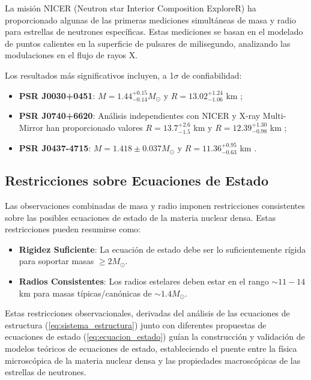 La misión NICER (Neutron star Interior Composition ExploreR) ha proporcionado algunas de las primeras mediciones simultáneas de masa y radio para estrellas de neutrones específicas. Estas mediciones se basan en el modelado de puntos calientes en la superficie de pulsares de milisegundo, analizando las modulaciones en el flujo de rayos X.

Los resultados más significativos incluyen, a 1$\sigma$ de confiabilidad:

\begin{itemize}
	\item \textbf{PSR J0030+0451}: $M = 1.44^{+0.15}_{-0.14} M_\odot$ y $R = 13.02^{+1.24}_{-1.06}$ km \cite{millerPSRJ0030+0451Mass2019};
	
	\item \textbf{PSR J0740+6620}: Análisis independientes con NICER y X-ray Multi-Mirror han proporcionado valores $R = 13.7^{+2.6}_{-1.5}$ km \cite{millerRadiusPSRJ0740+66202021} y $R = 12.39^{+1.30}_{-0.98}$ km \cite{rileyNICERViewMassive2021};
	
	\item \textbf{PSR J0437-4715}: $M = 1.418 \pm 0.037 M_\odot$ y $R = 11.36^{+0.95}_{-0.63}$ km \cite{choudhuryNICERViewNearest2024}.
\end{itemize}


\subsection{Restricciones sobre Ecuaciones de Estado}

Las observaciones combinadas de masa y radio imponen restricciones consistentes sobre las posibles ecuaciones de estado de la materia nuclear densa. Estas restricciones pueden resumirse como:

\begin{itemize}
	\item \textbf{Rigidez Suficiente}: La ecuación de estado debe ser lo suficientemente rígida para soportar masas $\geq 2 M_\odot$.
	
	\item \textbf{Radios Consistentes}: Los radios estelares deben estar en el rango $\sim 11-14$ km para masas típicas/canónicas de $\sim 1.4 M_\odot$.
\end{itemize}

Estas restricciones observacionales, derivadas del análisis de las ecuaciones de estructura (\ref{eq:sistema_estructura}) junto con diferentes propuestas de ecuaciones de estado (\ref{eq:ecuacion_estado}) guían la construcción y validación de modelos teóricos de ecuaciones de estado, estableciendo el puente entre la física microscópica de la materia nuclear densa y las propiedades macroscópicas de las estrellas de neutrones.

